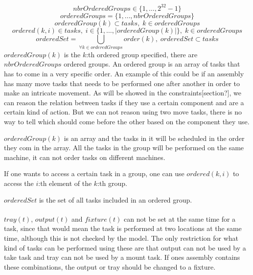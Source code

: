  \begin{equation}\label{eq:9}
 nbrOrderedGroups \in \{1 , \ldots , 2^{32}-1\}
 \end{equation}
 \begin{equation}\label{eq:9}
 orderedGroups = \{1 , \ldots , nbrOrderedGroups\}
 \end{equation}
 \begin{equation}\label{eq:18}
 orderedGroup(k) \subset tasks, \; k \in orderedGroups
 \end{equation}
 \begin{equation}\label{eq:32}
 ordered(k,i) \in tasks, \; i \in \{1 , \ldots , |orderedGroup(k)|\}, \; k \in orderedGroups
 \end{equation}
 \begin{equation}\label{eq:39}
 orderedSet = \bigcup_{\forall k \in orderedGroups}order(k), \; orderedSet \subset tasks\end{equation}
 $orderedGroup(k)$ is the $k$:th ordered group specified, there are $nbrOrderedGroups$ ordered groups. An ordered group is an array of tasks that has to come in a very specific order. An example of this could be if an assembly has many move tasks that needs to be performed one after another in order to make an intricate movement. As will be showed in the constraints[section?], we can reason the relation between tasks if they use a certain component and are a certain kind of action. But we can not reason using two move tasks, there is no way to tell which should come before the other based on the component they use. 
 
 $orderedGroup(k)$ is an array and the tasks in it will be scheduled in the order they com in the array. All the tasks in the group will be performed on the same machine, it can not order tasks on different machines.
 
 If one wants to access a certain task in a group, one can use $ordered(k,i)$ to access the $i$:th element of the $k$:th group.
 
 $orderedSet$ is the set of all tasks included in an ordered group.
 \\\\
 $tray(t)$, $output(t)$ and $fixture(t)$ can not be set at the same time for a task, since that would mean the task is performed at two locations at the same time, although this is not checked by the model. The only restriction for what kind of tasks can be performed using these are that output can not be used by a take task and tray can not be used by a mount task. If ones assembly contains these combinations, the output or tray should be changed to a fixture.
 
